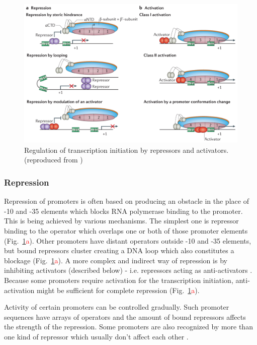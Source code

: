 \begin{figure}[ht!]
  \centering
  \includegraphics[scale=0.4]{text/Pictures/TxnInitRegulation.png}
	\caption{Regulation of transcription initiation by repressors and activators. (reproduced from \cite{browning2016local})}
	\label{txn}
\end{figure}

\subsubsection{Repression}
Repression of promoters is often based on producing an obstacle in the place of -10 and -35 elements which blocks RNA polymerase binding to the promoter.
This is being achieved by various mechanisms.
The simplest one is repressor binding to the operator which overlaps one or both of those promoter elements \cite{brent1981mechanism} (Fig.~\ref{txn}\textcolor{red}{a}).
Other promoters have distant operators outside -10 and -35 elements, but bound repressors cluster creating a DNA loop which also constitutes a blockage \cite{semsey2004dna} (Fig.~\ref{txn}\textcolor{red}{a}).
A more complex and indirect way of repression is by inhibiting activators (described below) - i.e. repressors acting as anti-activators \cite{sogaard1993protein}.
Because some promoters require activation for the transcription initiation, anti-activation might be sufficient for complete repression (Fig.~\ref{txn}\textcolor{red}{a}).

Activity of certain promoters can be controlled gradually.
Such promoter sequences have arrays of operators and the amount of bound repressors affects the strength of the repression.
Some promoters are also recognized by more than one kind of repressor which usually don't affect each other \cite{el2009repression}.

